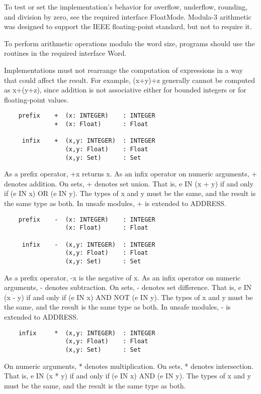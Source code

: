 \documentclass[10pt]{article}
\begin{document}
To test or set the implementation's behavior for overflow, underflow,
rounding, and division by zero, see the required interface FloatMode.
Modula-3 arithmetic was designed to support the IEEE floating-point standard,
but not to require it.

To perform arithmetic operations modulo the word size, programs should use the
routines in the required interface Word.

Implementations must not rearrange the computation of expressions in a way
that could affect the result.  For example, (x+y)+z generally cannot be
computed as x+(y+z), since addition is not associative either for bounded
integers or for floating-point values.

\begin{verbatim}
    prefix    +  (x: INTEGER)    : INTEGER
              +  (x: Float)      : Float

     infix    +  (x,y: INTEGER)  : INTEGER
                 (x,y: Float)    : Float
                 (x,y: Set)      : Set
\end{verbatim}
As a prefix operator, +x returns x.  As an infix operator on numeric
arguments, + denotes addition.  On sets, + denotes set union.  That is, e IN
(x + y) if and only if (e IN x) OR (e IN y).  The types of x and y must be the
same, and the result is the same type as both.  In unsafe modules, + is
extended to ADDRESS.

\begin{verbatim}
    prefix    -  (x: INTEGER)    : INTEGER
                 (x: Float)      : Float

     infix    -  (x,y: INTEGER)  : INTEGER
                 (x,y: Float)    : Float
                 (x,y: Set)      : Set
\end{verbatim}
As a prefix operator, -x is the negative of x.  As an infix operator on
numeric arguments, - denotes subtraction.  On sets, - denotes set difference.
That is, e IN (x - y) if and only if (e IN x) AND NOT (e IN y).  The types of
x and y must be the same, and the result is the same type as both.  In unsafe
modules, - is extended to ADDRESS.

\begin{verbatim}
    infix     *  (x,y: INTEGER)  : INTEGER
                 (x,y: Float)    : Float
                 (x,y: Set)      : Set
\end{verbatim}
On numeric arguments, * denotes multiplication.  On sets, * denotes
intersection.  That is, e IN (x * y) if and only if (e IN x) AND (e IN y).
The types of x and y must be the same, and the result is the same type as
both.
\end{document}
